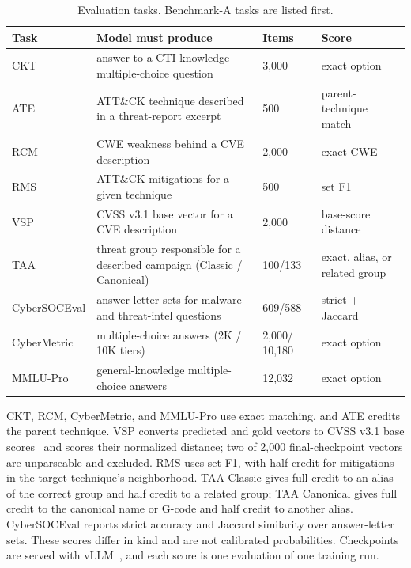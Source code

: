 \documentclass[conference]{IEEEtran}
\begin{document}
\begin{table}[t]
\caption{Evaluation tasks. Benchmark-A tasks are listed first.}
\label{tab:eval}
\centering
\scriptsize
\setlength{\tabcolsep}{2.5pt}
\begin{tabular}{@{}p{}p{}p{}p{}@{}}
\toprule
Task & Model must produce & Items & Score \\
\midrule
CKT & answer to a CTI knowledge multiple-choice question & 3,000 & exact option \\
ATE & ATT\&CK technique described in a threat-report excerpt & 500 & parent-technique match \\
RCM & CWE weakness behind a CVE description & 2,000 & exact CWE \\
RMS & ATT\&CK mitigations for a given technique & 500 & set F1 \\
VSP & CVSS v3.1 base vector for a CVE description & 2,000 & base-score distance \\
TAA & threat group responsible for a described campaign (Classic / Canonical) & 100/133 & exact, alias, or related group \\
\midrule
Cyber\-SOC\-Eval & answer-letter sets for malware and threat-intel questions & 609/588 & strict + Jaccard \\
CyberMetric & multiple-choice answers (2K / 10K tiers) & 2,000/ 10,180 & exact option \\
MMLU-Pro & general-knowledge multiple-choice answers & 12,032 & exact option \\
\bottomrule
\end{tabular}
\end{table}

CKT, RCM, CyberMetric, and MMLU-Pro use exact matching, and ATE credits the parent technique. VSP converts predicted and gold vectors to CVSS v3.1 base scores~\cite{first2019cvss} and scores their normalized distance; two of 2,000 final-checkpoint vectors are unparseable and excluded. RMS uses set F1, with half credit for mitigations in the target technique's neighborhood. TAA Classic gives full credit to an alias of the correct group and half credit to a related group; TAA Canonical gives full credit to the canonical name or G-code and half credit to another alias. CyberSOCEval reports strict accuracy and Jaccard similarity over answer-letter sets. These scores differ in kind and are not calibrated probabilities. Checkpoints are served with vLLM~\cite{kwon2023vllm}, and each score is one evaluation of one training run.
\end{document}
